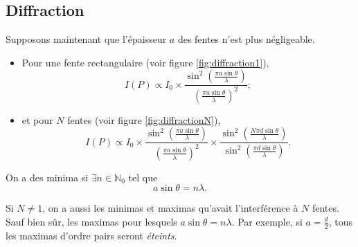 
\subsection{Diffraction}
Supposons maintenant que l'épaisseur $a$ des fentes n'est plus
négligeable.
\begin{itemize}
  \item Pour une fente rectangulaire (voir figure \ref{fig:diffraction1}),
    \[ I(P) \propto I_0 \times
      \frac{\sin^2\left(\frac{\pi a \sin\theta}{\lambda}\right)}
    {\left(\frac{\pi a \sin\theta}{\lambda}\right)^2}; \]
  \item et pour $N$ fentes (voir figure \ref{fig:diffractionN}),
    \[ I(P) \propto I_0 \times
      \frac{\sin^2\left(\frac{\pi a \sin\theta}{\lambda}\right)}
      {\left(\frac{\pi a \sin\theta}{\lambda}\right)^2} \times
      \frac{\sin^2\left(\frac{N \pi d \sin\theta}{\lambda}\right)}
    {\sin^2\left(\frac{\pi d \sin\theta}{\lambda}\right)}. \]
\end{itemize}
On a des minima si $\exists n \in \mathbb{N}_0$ tel que
\[ a \sin \theta = n\lambda. \]

Si $N \neq 1$, on a aussi les minimas et maximas qu'avait
l'interférence à $N$ fentes.
Sauf bien sûr, les maximas pour lesquels $a\sin\theta = n\lambda$.
Par exemple, si $a = \frac{d}{2}$, tous les maximas d'ordre pairs
seront \emph{éteints}.


